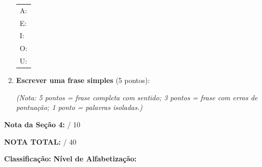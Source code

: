 \begin{avaliacao}
\begin{enumerate}[resume]
  \begin{center}
  \begin{tabular}{l}
    A: \underline{\hspace{2.5cm}} \quad \underline{\hspace{2.5cm}} \quad \underline{\hspace{2.5cm}} \\[0.5em]
    E: \underline{\hspace{2.5cm}} \quad \underline{\hspace{2.5cm}} \quad \underline{\hspace{2.5cm}} \\[0.5em]
    I: \underline{\hspace{2.5cm}} \quad \underline{\hspace{2.5cm}} \quad \underline{\hspace{2.5cm}} \\[0.5em]
    O: \underline{\hspace{2.5cm}} \quad \underline{\hspace{2.5cm}} \quad \underline{\hspace{2.5cm}} \\[0.5em]
    U: \underline{\hspace{2.5cm}} \quad \underline{\hspace{2.5cm}} \quad \underline{\hspace{2.5cm}} \\
  \end{tabular}
  \end{center}

  \item \textbf{Escrever uma frase simples} (5 pontos):

  \begin{center}
  \underline{\hspace{10cm}}
  \end{center}
  \textit{(Nota: 5 pontos = frase completa com sentido; 3 pontos = frase
  com erros de pontuação; 1 ponto = palavras isoladas.)}
\end{enumerate}

\medskip
\noindent\textbf{Nota da Seção 4:} \underline{\hspace{1cm}} / 10

\begin{center}
\large\textbf{NOTA TOTAL:} \underline{\hspace{1.5cm}} / 40
\end{center}

\begin{center}
\textbf{Classifica\c{c}\~{a}o:} \underline{\hspace{3cm}}
\hspace{1cm}
\textbf{N\'{i}vel de Alfabetiza\c{c}\~{a}o:} \underline{\hspace{3cm}}
\end{center}

\end{avaliacao}

